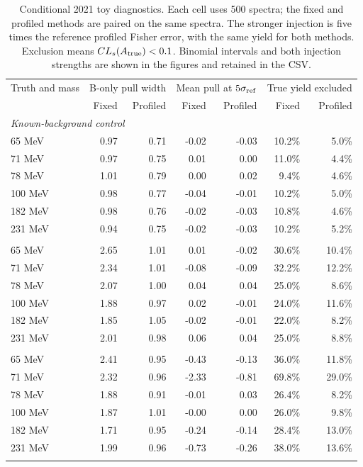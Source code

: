 \begin{table}[htbp]\centering\small
\setlength{\tabcolsep}{4pt}
\begin{tabular}{lrrrrrr}\toprule
Truth and mass & \multicolumn{2}{c}{B-only pull width} & \multicolumn{2}{c}{Mean pull at $5\sigma_{\rm ref}$} & \multicolumn{2}{c}{True yield excluded} \\
 & Fixed & Profiled & Fixed & Profiled & Fixed & Profiled \\ \midrule
\multicolumn{7}{l}{\emph{Known-background control}} \\
65 MeV & 0.97 & 0.71 & -0.02 & -0.03 & 10.2\% & 5.0\% \\
71 MeV & 0.97 & 0.75 & 0.01 & 0.00 & 11.0\% & 4.4\% \\
78 MeV & 1.01 & 0.79 & 0.00 & 0.02 & 9.4\% & 4.6\% \\
100 MeV & 0.98 & 0.77 & -0.04 & -0.01 & 10.2\% & 5.0\% \\
182 MeV & 0.98 & 0.76 & -0.02 & -0.03 & 10.8\% & 4.6\% \\
231 MeV & 0.94 & 0.75 & -0.02 & -0.03 & 10.2\% & 5.2\% \\
\addlinespace
\multicolumn{7}{l}{\emph{Conditional GP uncertainty}} \\
65 MeV & 2.65 & 1.01 & 0.01 & -0.02 & 30.6\% & 10.4\% \\
71 MeV & 2.34 & 1.01 & -0.08 & -0.09 & 32.2\% & 12.2\% \\
78 MeV & 2.07 & 1.00 & 0.04 & 0.04 & 25.0\% & 8.6\% \\
100 MeV & 1.88 & 0.97 & 0.02 & -0.01 & 24.0\% & 11.6\% \\
182 MeV & 1.85 & 1.05 & -0.02 & -0.01 & 22.0\% & 8.2\% \\
231 MeV & 2.01 & 0.98 & 0.06 & 0.04 & 25.0\% & 8.8\% \\
\addlinespace
\multicolumn{7}{l}{\emph{GP retrained on sidebands}} \\
65 MeV & 2.41 & 0.95 & -0.43 & -0.13 & 36.0\% & 11.8\% \\
71 MeV & 2.32 & 0.96 & -2.33 & -0.81 & 69.8\% & 29.0\% \\
78 MeV & 1.88 & 0.91 & -0.01 & 0.03 & 26.4\% & 8.2\% \\
100 MeV & 1.87 & 1.01 & -0.00 & 0.00 & 26.0\% & 9.8\% \\
182 MeV & 1.71 & 0.95 & -0.24 & -0.14 & 28.4\% & 13.0\% \\
231 MeV & 1.99 & 0.96 & -0.73 & -0.26 & 38.0\% & 13.6\% \\
\addlinespace
\bottomrule\end{tabular}
\caption{Conditional 2021 toy diagnostics. Each cell uses 500 spectra; the fixed and profiled methods are paired on the same spectra. The stronger injection is five times the reference profiled Fisher error, with the same yield for both methods. Exclusion means $CL_s(A_{\rm true})<0.1$. Binomial intervals and both injection strengths are shown in the figures and retained in the CSV.}
\label{tab:toy-summary}\end{table}
